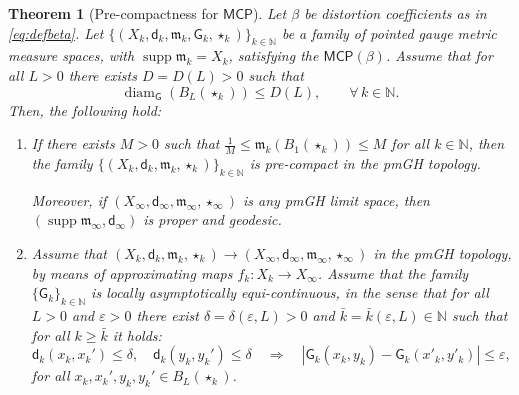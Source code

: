 \documentclass[11pt,a4paper]{article}
\theoremstyle{plain}
\newtheorem{theorem}{Theorem}[section]
\theoremstyle{definition}
\theoremstyle{remark}
\numberwithin{equation}{section}
\newcommand{\N}{\mathbb{N}} %
\DeclareMathOperator{\supp}{\mathrm{supp}}
\newcommand{\ve}{\varepsilon}
\newcommand{\MCP}{\mathsf{MCP}}
\DeclareMathOperator{\diam}{\mathrm{diam}}
\newcommand{\mm}{\mathfrak m}
\newcommand{\sfd}{\mathsf d}
\newcommand{\sfG}{\mathsf G}
\begin{document}
\begin{theorem}[Pre-compactness for $\MCP$]\label{thm:precompactMCP}
Let $\beta$ be distortion coefficients as in \eqref{eq:defbeta}. Let $\{(X_k,\sfd_k,\mm_k, \sfG_{k},\star_k)\}_{k\in \N}$ be a family of pointed gauge metric measure spaces, with $\supp\mm_k = X_k$, satisfying the $\MCP(\beta)$. Assume that for all $L>0$ there exists $D=D(L)>0$ such that
\begin{equation}
\diam_{\sfG}(B_L(\star_k)) \leq D(L),\qquad \forall\, k\in \N.
\end{equation}
Then, the following hold:
\begin{enumerate}[label = (\roman*)]
\item \label{i:ComMCP1} If there exists $M>0$ such that $\tfrac{1}{M}\leq \mm_k(B_1(\star_k))\leq M$ for all $k\in \N$, then the family $\{(X_k,\sfd_k,\mm_k,\star_k)\}_{k\in \N}$ is pre-compact in the pmGH topology.  

Moreover, if $(X_\infty,\sfd_\infty,\mm_\infty,\star_\infty)$ is any pmGH limit space, then $(\supp\mm_\infty, \sfd_\infty)$ is proper and geodesic.
\item  \label{i:ComMCP2} Assume that $(X_k,\sfd_k,\mm_k,\star_k)\to (X_\infty,\sfd_\infty,\mm_\infty,\star_\infty)$ in the pmGH topology, by means of approximating maps $f_k:X_k \to X_\infty$.  Assume that the family $\{\sfG_k\}_{k\in\N}$ is locally asymptotically equi-continuous, in the sense that for all $L>0$ and $\ve>0$ there exist $\delta=\delta(\ve,L)>0$ and $\bar{k}=\bar{k}(\ve,L)\in \N$ such that for all $k\geq \bar{k}$ it holds:
\begin{equation}\label{eq:GkEquicont}
\sfd_k(x_k,x_k')\leq \delta, \quad \sfd_k(y_k,y_k')\leq \delta \quad \Longrightarrow \quad |\sfG_k(x_k,y_k)-\sfG_k(x'_k,y'_k)| \leq \ve,
\end{equation}
for all $x_k,x_k',y_k,y_k'\in B_L(\star_k)$.


\end{enumerate}
\end{theorem}
\end{document}
